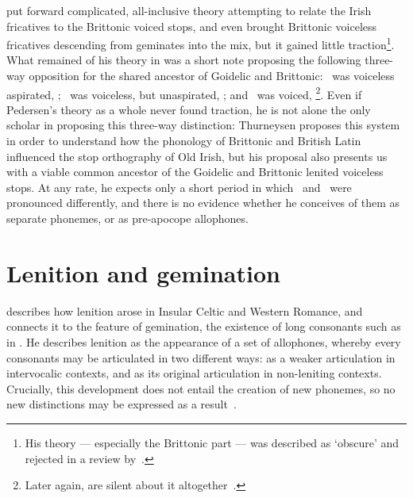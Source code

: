 \Textcite{Ped_Aspirationen97} put forward complicated, all-inclusive theory attempting to relate the Irish fricatives to the Brittonic voiced stops, and even brought Brittonic voiceless fricatives descending from geminates into the mix, but it gained little traction\footnote{His theory — especially the Brittonic part — was described as `obscure' and rejected in a review by~\autocite{Str_Erschienene99}.}. What remained of his theory in \textcite[§§~149,~303]{Ped_Vergleichende09} was a short note proposing the following three-way opposition for the shared ancestor of Goidelic and Brittonic: \xT\ was voiceless aspirated, \ie [pʰ tʰ kʰ]; \lT\ was voiceless, but unaspirated, \ie [p t k]; and \xD\ was voiced, \ie [b d ɡ]\footnote{Later again, \textcite{LP_Concise37} are silent about it altogether~\autocite[§~131]{jackson_language_1953}.}. Even if Pedersen's theory as a whole never found traction, he is not alone the only scholar in proposing this three-way distinction:
Thurneysen proposes this system in order to understand how the phonology of Brittonic and British Latin influenced the stop orthography of Old Irish, but his proposal also presents us with a viable common ancestor of the Goidelic and Brittonic lenited voiceless stops. At any rate, he expects only a short period in which \lT\ and \xD\ were pronounced differently, and there is no evidence whether he conceives of them as separate phonemes, or as pre-apocope allophones.



\section{Lenition and gemination}
\label{sec:martinet}

\Textcite{martinet_celtic_1952} describes how lenition arose in Insular Celtic and Western Romance, and connects it to the feature of gemination, \ie the existence of long consonants such as  in . He describes lenition as the appearance of a set of allophones, whereby every consonants may be articulated in two different ways: as a weaker articulation in intervocalic contexts, and as its original articulation in non-leniting contexts. Crucially, this development does not entail the creation of new phonemes, so no new distinctions may be expressed as a result~\autocite[192]{martinet_celtic_1952}.

